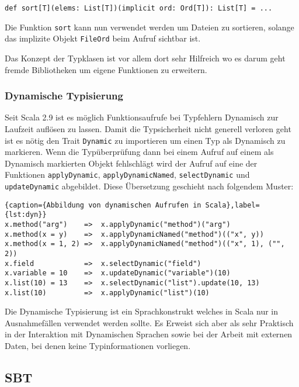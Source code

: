 \begin{lstlisting}
def sort[T](elems: List[T])(implicit ord: Ord[T]): List[T] = ...
\end{lstlisting}

Die Funktion \texttt{sort} kann nun verwendet werden um Dateien zu sortieren, solange das implizite Objekt
\texttt{FileOrd} beim Aufruf sichtbar ist.

Das Konzept der Typklasen ist vor allem dort sehr Hilfreich wo es darum geht fremde  Bibliotheken um
eigene Funktionen zu erweitern.

\subsubsection{Dynamische Typisierung}

Seit Scala 2.9 ist es möglich Funktionsaufrufe bei Typfehlern Dynamisch zur  Laufzeit auflösen zu
lassen. Damit die Typsicherheit nicht generell verloren  geht ist es nötig den Trait
\texttt{Dynamic} zu importieren um einen Typ als  Dynamisch zu markieren. Wenn die Typüberprüfung
dann bei einem Aufruf auf einem als Dynamisch markierten Objekt fehlschlägt wird der Aufruf auf eine
der Funktionen \texttt{applyDynamic}, \texttt{applyDynamicNamed}, \texttt{selectDynamic} und
\texttt{updateDynamic}  abgebildet. Diese Übersetzung geschieht nach folgendem Muster:

\begin{lstlisting}{caption={Abbildung von dynamischen Aufrufen in Scala},label={lst:dyn}}
x.method("arg")    =>  x.applyDynamic("method")("arg")
x.method(x = y)    =>  x.applyDynamicNamed("method")(("x", y))
x.method(x = 1, 2) =>  x.applyDynamicNamed("method")(("x", 1), ("", 2))
x.field            =>  x.selectDynamic("field")
x.variable = 10    =>  x.updateDynamic("variable")(10)
x.list(10) = 13    =>  x.selectDynamic("list").update(10, 13)
x.list(10)         =>  x.applyDynamic("list")(10)
\end{lstlisting}
 
Die Dynamische Typisierung ist ein Sprachkonstrukt welches in Scala nur in Ausnahmefällen verwendet
werden sollte. Es Erweist sich aber als sehr Praktisch in der Interaktion mit Dynamischen Sprachen
sowie bei der Arbeit mit externen Daten, bei denen keine Typinformationen vorliegen.

\subsection{SBT}
\label{sec:sbt}

